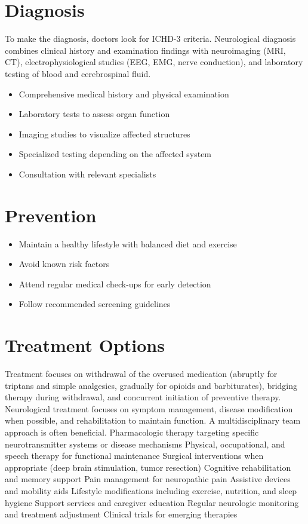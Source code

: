\section{Diagnosis}
To make the diagnosis, doctors look for ICHD-3 criteria. Neurological diagnosis combines clinical history and examination findings with neuroimaging (MRI, CT), electrophysiological studies (EEG, EMG, nerve conduction), and laboratory testing of blood and cerebrospinal fluid.

\begin{itemize}[noitemsep]
  \item Comprehensive medical history and physical examination
  \item Laboratory tests to assess organ function
  \item Imaging studies to visualize affected structures
  \item Specialized testing depending on the affected system
  \item Consultation with relevant specialists
\end{itemize}
\section{Prevention}
\begin{itemize}[noitemsep]
  \item Maintain a healthy lifestyle with balanced diet and exercise
  \item Avoid known risk factors
  \item Attend regular medical check-ups for early detection
  \item Follow recommended screening guidelines
\end{itemize}
\section{Treatment Options}
Treatment focuses on withdrawal of the overused medication (abruptly for triptans and simple analgesics, gradually for opioids and barbiturates), bridging therapy during withdrawal, and concurrent initiation of preventive therapy. Neurological treatment focuses on symptom management, disease modification when possible, and rehabilitation to maintain function. A multidisciplinary team approach is often beneficial. Pharmacologic therapy targeting specific neurotransmitter systems or disease mechanisms Physical, occupational, and speech therapy for functional maintenance Surgical interventions when appropriate (deep brain stimulation, tumor resection) Cognitive rehabilitation and memory support Pain management for neuropathic pain Assistive devices and mobility aids Lifestyle modifications including exercise, nutrition, and sleep hygiene Support services and caregiver education Regular neurologic monitoring and treatment adjustment Clinical trials for emerging therapies

